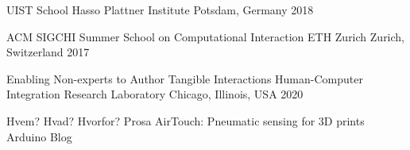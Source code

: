 
    \begin{cventries}
      \cventry
        {UIST School}
        {Hasso Plattner Institute}
        {Potsdam, Germany}
        {2018}
        {}

      \cventry
        {ACM SIGCHI Summer School on Computational Interaction}
        {ETH Zurich}
        {Zurich, Switzerland}
        {2017}
        {}
    \end{cventries}

    \begin{cventries}
      \cventry
        {Enabling Non-experts to Author Tangible Interactions}
        {Human-Computer Integration Research Laboratory}
        {Chicago, Illinois, USA}
        {2020}
        {
          \vspace{1em}
        }
    \end{cventries}

    \begin{cventries}
      \cventry
        {Hvem? Hvad? Hvorfor?}
        {Prosa}
        {}
        {}
        {}
      \cventry
        {AirTouch: Pneumatic sensing for 3D prints}
        {Arduino Blog}
        {}
        {}
        {}
    \end{cventries}

